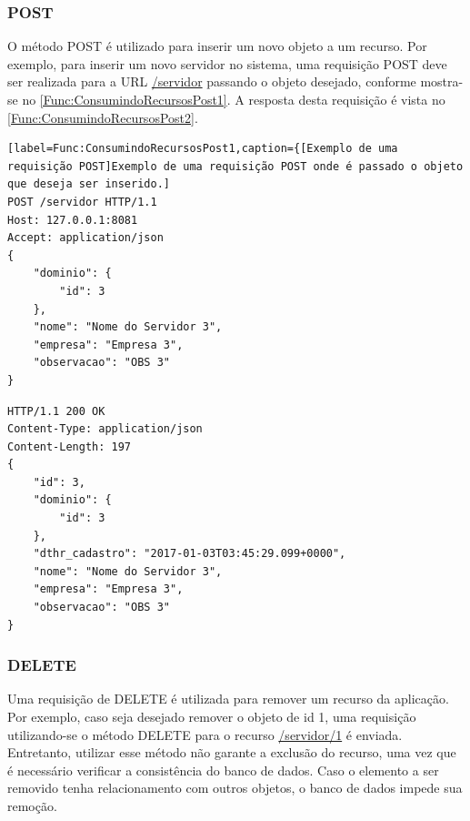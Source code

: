 \subsubsection{POST}

O método POST é utilizado para inserir um novo objeto a um recurso. Por exemplo, para inserir um novo servidor no sistema, uma requisição POST deve ser realizada para a URL \url{/servidor} passando o objeto desejado, conforme mostra-se no \autoref{Func:ConsumindoRecursosPost1}. A resposta desta requisição é vista no \autoref{Func:ConsumindoRecursosPost2}.


\begin{lstlisting}[label=Func:ConsumindoRecursosPost1,caption={[Exemplo de uma requisição POST]Exemplo de uma requisição POST onde é passado o objeto que deseja ser inserido.]
POST /servidor HTTP/1.1
Host: 127.0.0.1:8081
Accept: application/json
{
    "dominio": {
        "id": 3
    },
    "nome": "Nome do Servidor 3",
    "empresa": "Empresa 3",
    "observacao": "OBS 3"
}
\end{lstlisting}

\begin{lstlisting}[label=Func:ConsumindoRecursosPost2,caption={[Exemplo de uma resposta a uma requisição POST] Exemplo de uma resposta a uma requisição POST}]
HTTP/1.1 200 OK
Content-Type: application/json
Content-Length: 197
{
    "id": 3,
    "dominio": {
        "id": 3
    },
    "dthr_cadastro": "2017-01-03T03:45:29.099+0000",
    "nome": "Nome do Servidor 3",
    "empresa": "Empresa 3",
    "observacao": "OBS 3"
}
\end{lstlisting}

\subsubsection{DELETE}

Uma requisição de DELETE é utilizada para remover um recurso da aplicação. Por exemplo, caso seja desejado remover o objeto de id 1, uma requisição utilizando-se o método DELETE para o recurso \url{/servidor/1} é enviada. Entretanto, utilizar esse método não garante a exclusão do recurso, uma vez que é necessário verificar a consistência do banco de dados. Caso o elemento a ser removido tenha relacionamento com outros objetos, o banco de dados impede sua remoção.

